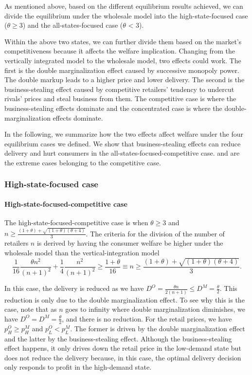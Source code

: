 \documentclass[12pt]{article}
\begin{document}
As mentioned above, based on the different equilibrium results achieved, we can divide the equilibrium under the wholesale model into the high-state-focused case ($\theta \geq 3$) and the all-states-focused case ($\theta$ < 3). 

Within the above two states, we can further divide them based on the market's competitiveness because it affects the welfare implication. Changing from the vertically integrated model to the wholesale model, two effects could work. The first is the double marginalization effect caused by successive monopoly power. The double markup leads to a higher price and lower delivery. The second is the business-stealing effect caused by competitive retailers' tendency to undercut rivals' prices and steal business from them. The competitive case is where the business-stealing effects dominate and the concentrated case is where the double-marginalization effects dominate.

In the following, we summarize how the two effects affect welfare under the four equilibrium cases we defined. We show that business-stealing effects can reduce delivery and hurt consumers in the all-states-focused-competitive case. \cite{deneckereDemandUncertaintyInventories1996} and \cite{deneckereDemandUncertaintyPrice1997} are the extreme cases belonging to the competitive case.

\subsubsection{High-state-focused case}

\paragraph{High-state-focused-competitive case}
The high-state-focused-competitive case is when $\theta \geq 3$ and $n \geq \frac{(1+\theta) + \sqrt{(1+\theta)(\theta + 4)}}{3}$. The criteria for the division of the number of retailers $n$ is derived by having the consumer welfare be higher under the wholesale model than the vertical-integration model
\begin{equation}
	\frac{1}{16}\frac{\theta n^2}{(n + 1)^2} + \frac{1}{4}\frac{n^2}{(n + 1)^2} \geq \frac{1 + \theta}{16} \equiv n \geq \frac{(1+\theta) + \sqrt{(1+\theta)(\theta + 4)}}{3}.
\end{equation}

In this case, the delivery is reduced as we have $D^O = \frac{\theta n}{2(n + 1)} \leq D^M = \frac{\theta}{2}$. This reduction is only due to the double marginalization effect. To see why this is the case, note that as $n$ goes to infinity where double marginalization diminishes, we have $D^O =  D^M = \frac{\theta}{2}$, and there is no reduction. 
For the retail prices, we have $p^O_{H} \geq p^M_{H}$ and $p^O_{L} < p^M_{L}$. The former is driven by the double marginalization effect and the latter by the business-stealing effect. Although the business-stealing effect happens, it only drives down the retail price in the low-demand state but does not reduce the delivery because, in this case, the optimal delivery decision only responds to profit in the high-demand state. 
\end{document}
